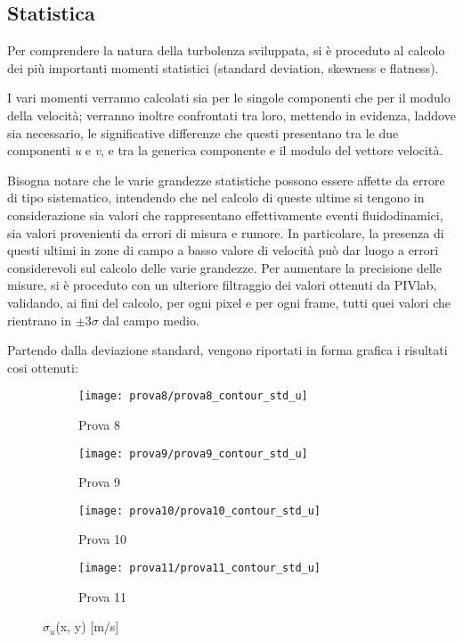 \documentclass{article} %
\begin{document}
\subsection{Statistica}
Per comprendere la natura della turbolenza sviluppata, si è proceduto al calcolo dei più importanti momenti statistici (standard deviation, skewness e flatness).\par
I vari momenti verranno calcolati sia per le singole componenti che per il modulo della velocità; verranno inoltre confrontati tra loro, mettendo in evidenza, laddove sia necessario, le significative differenze che questi presentano tra le due componenti \textit{u} e \textit{v}, e tra la generica componente e il modulo del vettore velocità.\par
Bisogna notare che le varie grandezze statistiche possono essere affette da errore di tipo sistematico, intendendo che nel calcolo di queste ultime si tengono in considerazione sia valori che rappresentano effettivamente eventi fluidodinamici, sia valori provenienti da errori di misura e rumore. In particolare, la presenza di questi ultimi in zone di campo a basso valore di velocità può dar luogo a errori considerevoli sul calcolo delle varie grandezze. Per aumentare la precisione delle misure, si è proceduto con un ulteriore filtraggio dei valori ottenuti da PIVlab, validando, ai fini del calcolo, per ogni pixel e per ogni frame, tutti quei valori che rientrano in $\pm 3\sigma$ dal campo medio.\par 
Partendo dalla deviazione standard, vengono riportati in forma grafica i risultati cosi ottenuti:\par
\begin{figure}[h!]
	\centering
	\begin{subfigure}[b]{0.24\textwidth}
		\texttt{[image: prova8/prova8\_contour\_std\_u]}
		\caption{Prova 8}
	\end{subfigure}
	\begin{subfigure}[b]{0.24\textwidth}
		\texttt{[image: prova9/prova9\_contour\_std\_u]}
		\caption{Prova 9}
	\end{subfigure}
	\begin{subfigure}[b]{0.24\textwidth}
		\texttt{[image: prova10/prova10\_contour\_std\_u]}
		\caption{Prova 10}
	\end{subfigure}
	\begin{subfigure}[b]{0.24\textwidth}
		\texttt{[image: prova11/prova11\_contour\_std\_u]}
		\caption{Prova 11}
	\end{subfigure}
	\caption{$\sigma_u$(x, y) [m/s]}
	\label{fig:contour_std_u_8901}
\end{figure}
\end{document}
